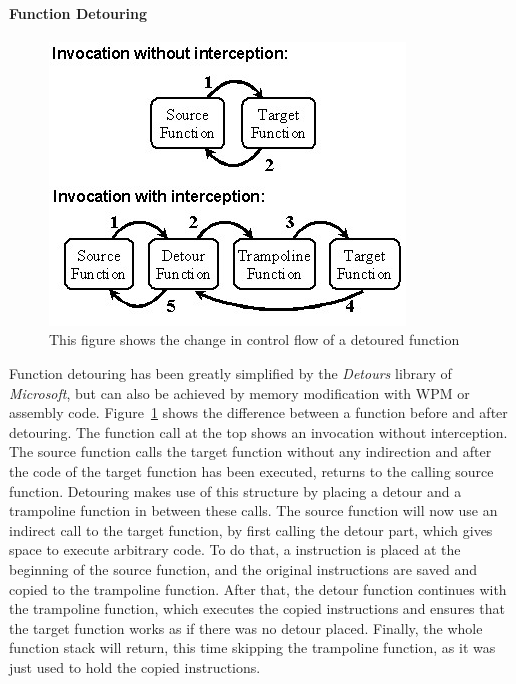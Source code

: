 \paragraph{Function Detouring}
\begin{figure}[h]
	\centering
	\includegraphics[keepaspectratio,width=.6\textwidth]{sections/background/attacks/fig_detours.png}
	\caption{This figure shows the change in control flow of a detoured function \cite{detours}}
	\label{fig:detours}
\end{figure}
Function detouring has been greatly simplified by the \emph{Detours} \cite{msdetours} library of \emph{Microsoft}, but can also be achieved by memory modification with \gls{WPM} or assembly code. Figure~\ref{fig:detours} shows the difference between a function before and after detouring. The function call at the top shows an invocation without interception. The source function calls the target function without any indirection and after the code of the target function has been executed, returns to the calling source function. Detouring makes use of this structure by placing a detour and a trampoline function in between these calls. The source function will now use an indirect call to the target function, by first calling the detour part, which gives space to execute arbitrary code. To do that, a  instruction is placed at the beginning of the source function, and the original instructions are saved and copied to the trampoline function. After that, the detour function continues with the trampoline function, which executes the copied instructions and ensures that the target function works as if there was no detour placed. Finally, the whole function stack will return, this time skipping the trampoline function, as it was just used to hold the copied instructions.